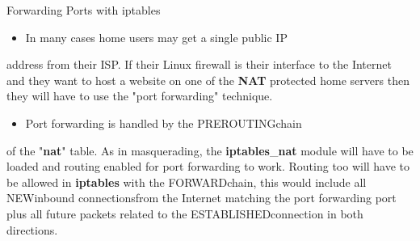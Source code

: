 \begin{frame}[t,allowframebreaks]{Forwarding Ports with iptables}
  \fontsize{15}{18}\selectfont
  \begin{itemize}
    \item In many cases home users may get a single public IP
  \end{itemize}
  address from their ISP. If their Linux firewall is their interface to the Internet and they want to host a website on one of the \textcolor{CommandGreen}{\bfseries NAT} protected home servers then they will have to use the "port forwarding" technique.\par
  \begin{itemize}
    \item Port forwarding is handled by the PREROUTINGchain
  \end{itemize}
  of the "\textcolor{CommandGreen}{\bfseries nat}" table. As in masquerading, the \textcolor{CommandGreen}{\bfseries iptables}\_\textcolor{CommandGreen}{\bfseries nat} module will have to be loaded and routing enabled for port forwarding to work. Routing too will have to be allowed in \textcolor{CommandGreen}{\bfseries iptables} with the FORWARDchain, this would include all NEWinbound connectionsfrom the Internet matching the port forwarding port plus all future packets related to the ESTABLISHEDconnection in both directions.\par
\end{frame}
